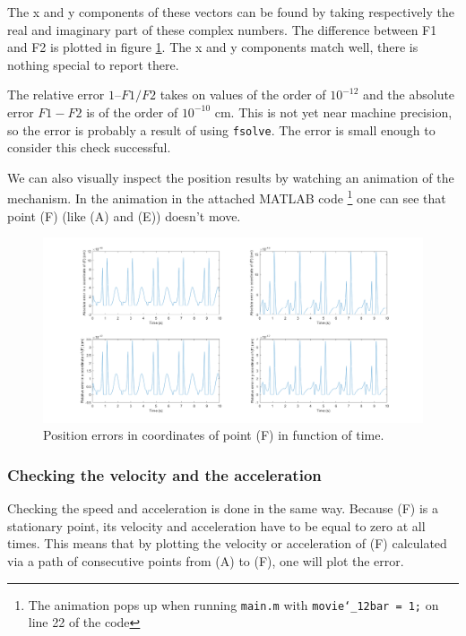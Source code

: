 \documentclass[a4paper]{article}
\begin{document}
The x and y components of these vectors can be found by taking respectively the real and imaginary part of these complex numbers. The difference between F1 and F2 is plotted in figure \ref{fig:contrpos}. The x and y components match well, there is nothing special to report there. 

The relative error \(1 – F1/F2\) takes on values of the order of \(10^{-12}\) and the absolute error \(F1-F2\) is of the order of \(10^{-10}\) cm. This is not yet near machine precision, so the error is probably a result of using \texttt{fsolve}. The error is small enough to consider this check successful.

We can also visually inspect the position results by watching an animation of the mechanism. In the animation in the attached MATLAB code \footnote{The animation pops up when running \texttt{main.m} with \texttt{movie\char`_12bar = 1;} on line 22 of the code} one can see that point (F) (like (A) and (E)) doesn’t move.

\begin{figure}
	\centering
	
	\includegraphics[width = \textwidth]{contrpos.png}
	
	\caption{Position errors in coordinates of point (F) in function of time.}
	\label{fig:contrpos}
	
\end{figure}

\subsubsection{Checking the velocity and the acceleration}

Checking the speed and acceleration is done in the same way. Because (F) is a stationary point, its velocity and acceleration have to be equal to zero at all times. This means that by plotting the velocity or acceleration of (F) calculated via a path of consecutive points from (A) to (F), one will plot the error.
\end{document}
